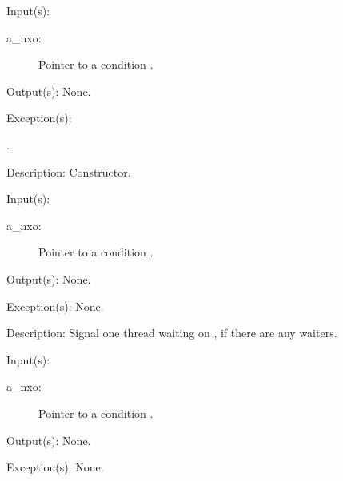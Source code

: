 \begin{capi}
\label{nxo_condition_new}
	\begin{capilist}
	\item[Input(s): ]
		\begin{description}\item[]
		\item[a\_nxo: ]
			Pointer to a condition .
		\end{description}
	\item[Output(s): ] None.
	\item[Exception(s): ]
		\begin{description}\item[]
		\item[.]
		\end{description}
	\item[Description: ]
		Constructor.
	\end{capilist}
\label{nxo_condition_signal}
	\begin{capilist}
	\item[Input(s): ]
		\begin{description}\item[]
		\item[a\_nxo: ]
			Pointer to a condition \classname{nxo}.
		\end{description}
	\item[Output(s): ] None.
	\item[Exception(s): ] None.
	\item[Description: ]
		Signal one thread waiting on , if there are any
		waiters.
	\end{capilist}
\label{nxo_condition_broadcast}
	\begin{capilist}
	\item[Input(s): ]
		\begin{description}\item[]
		\item[a\_nxo: ]
			Pointer to a condition .
		\end{description}
	\item[Output(s): ] None.
	\item[Exception(s): ] None.

\end{capilist}
\end{capi}
